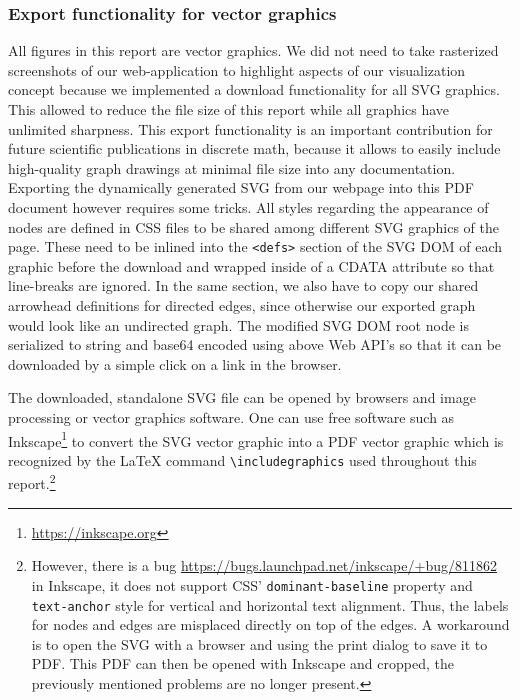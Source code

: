 \subsubsection{Export functionality for vector graphics}\label{sec:svgExport}
All figures in this report are vector graphics. We did not need to take rasterized screenshots of our web-application to highlight aspects of our visualization concept because we implemented a download functionality for all SVG graphics. This allowed to reduce the file size of this report while all graphics have unlimited sharpness. This export functionality is an important contribution for future scientific publications in discrete math, because it allows to easily include high-quality graph drawings at minimal file size into any documentation.
Exporting the dynamically generated SVG from our webpage into this PDF document however requires some tricks. All styles regarding the appearance of nodes are defined in CSS files to be shared among different SVG graphics of the page. These need to be inlined into the \texttt{<defs>} section of the SVG DOM of each graphic before the download and wrapped inside of a CDATA attribute so that line-breaks are ignored. In the same section, we also have to copy our shared arrowhead definitions for directed edges, since otherwise our exported graph would look like an undirected graph. The modified SVG DOM root node is serialized to string and base64 encoded using above Web API's so that it can be downloaded by a simple click on a link in the browser. 

The downloaded, standalone SVG file can be opened by browsers and image processing or vector graphics software. One can use free software such as Inkscape\footnote{\url{https://inkscape.org}} to convert the SVG vector graphic into a PDF vector graphic which is recognized by the \LaTeX{} command \texttt{\textbackslash includegraphics} used throughout this report.\footnote{However, there is a bug \url{https://bugs.launchpad.net/inkscape/+bug/811862} in Inkscape, it does not support CSS' \texttt{dominant-baseline} property and \texttt{text-anchor} style for vertical and horizontal text alignment. Thus, the labels for nodes and edges are misplaced directly on top of the edges. A workaround is to open the SVG with a browser and using the print dialog to save it to PDF. This PDF can then be opened with Inkscape and cropped, the previously mentioned problems are no longer present.}
